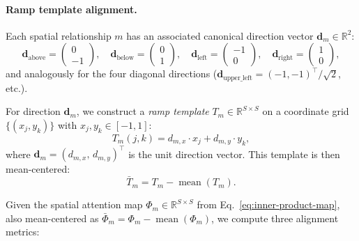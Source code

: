 \paragraph{Ramp template alignment.}
Each spatial relationship $m$ has an associated canonical direction vector $\mathbf{d}_m \in \mathbb{R}^2$:
\begin{equation}
    \mathbf{d}_{\text{above}} = \begin{pmatrix} 0 \\ -1 \end{pmatrix}, \quad
    \mathbf{d}_{\text{below}} = \begin{pmatrix} 0 \\ 1 \end{pmatrix}, \quad
    \mathbf{d}_{\text{left}} = \begin{pmatrix} -1 \\ 0 \end{pmatrix}, \quad
    \mathbf{d}_{\text{right}} = \begin{pmatrix} 1 \\ 0 \end{pmatrix},
\end{equation}
and analogously for the four diagonal directions ($\mathbf{d}_{\text{upper\_left}} = (-1, -1)^\top / \sqrt{2}$, etc.).

For direction $\mathbf{d}_m$, we construct a \emph{ramp template} $T_m \in \mathbb{R}^{S \times S}$ on a coordinate grid $\{(x_j, y_k)\}$ with $x_j, y_k \in [-1, 1]$:
\begin{equation}
    T_m(j,k) = d_{m,x} \cdot x_j + d_{m,y} \cdot y_k,
\end{equation}
where $\mathbf{d}_m = (d_{m,x},\, d_{m,y})^\top$ is the unit direction vector. This template is then mean-centered:
\begin{equation}
    \bar{T}_m = T_m - \operatorname{mean}(T_m).
\end{equation}

Given the spatial attention map $\Phi_m \in \mathbb{R}^{S \times S}$ from Eq.~\eqref{eq:inner-product-map}, also mean-centered as $\bar{\Phi}_m = \Phi_m - \operatorname{mean}(\Phi_m)$, we compute three alignment metrics:

